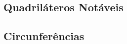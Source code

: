     \subsubsection{}
    \subsubsection{}
\subsection{Quadriláteros Notáveis}
\subsection{Circunferências}